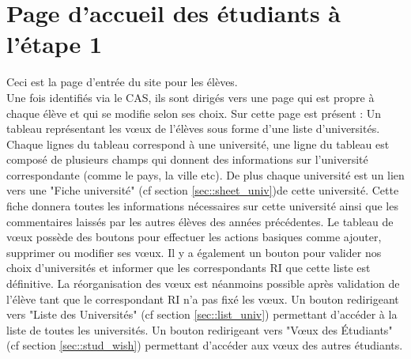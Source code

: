 \section{Page d'accueil des étudiants à l'étape 1}

Ceci est la page d'entrée du site pour les élèves.\\
Une fois identifiés via le CAS, ils sont dirigés vers une page qui est propre à chaque élève et qui se modifie selon ses choix.
Sur cette page est présent :
\bigbreak
Un tableau représentant les vœux de l'élèves sous forme d'une liste d'universités.
Chaque lignes du tableau correspond à une université, une ligne du tableau est composé de plusieurs champs qui donnent des informations sur l'université correspondante (comme le pays, la ville etc).
De plus chaque université est un lien vers une "Fiche université" (cf section \ref{sec::sheet_univ})de cette université. Cette fiche donnera toutes les informations nécessaires sur cette université ainsi que les commentaires laissés par les autres élèves des années précédentes.
Le tableau de vœux possède des boutons pour effectuer les actions basiques comme ajouter, supprimer ou modifier ses vœux. Il y a également un bouton pour valider nos choix d'universités et informer que les correspondants RI que cette liste est définitive. La réorganisation des vœux est néanmoins possible après validation de l'élève tant que le correspondant RI n'a pas fixé les vœux.
\bigbreak
Un bouton redirigeant vers "Liste des Universités" (cf section \ref{sec::list_univ}) permettant d'accéder à la liste de toutes les universités.
\bigbreak
Un bouton redirigeant vers "Vœux des Étudiants" (cf section \ref{sec::stud_wish}) permettant d'accéder aux vœux des autres étudiants.
